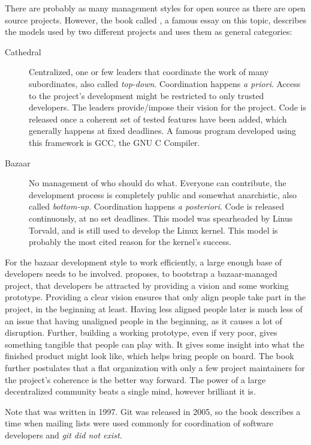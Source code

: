 There are probably as many management styles for open source as there are open source projects.
However, the book called  \cite{raymond_cathedral_2001}, a famous essay on this topic, describes the models used by two different projects and uses them as general categories:

\begin{description}
  \item[Cathedral]
    Centralized, one or few leaders that coordinate the work of many subordinates, also called \textit{top-down}.
    Coordination happens \textit{a priori}.
    Access to the project's development might be restricted to only trusted developers.
    The leaders provide/impose their vision for the project.
    Code is released once a coherent set of tested features have been added, which generally happens at fixed deadlines.
    A famous program developed using this framework is GCC, the GNU C Compiler.
  \item[Bazaar]
    No management of who should do what.
    Everyone can contribute, the development process is completely public and somewhat anarchistic, also called \textit{bottom-up}.
    Coordination happens \textit{a posteriori}.
    Code is released continuously, at no set deadlines.
    This model was spearheaded by Linus Torvald, and is still used to develop the Linux kernel.
    This model is probably the most cited reason for the kernel's success.
\end{description}

For the bazaar development style to work efficiently, a large enough base of developers needs to be involved.
\citeauthor{raymond_cathedral_2001} proposes, to bootstrap a bazaar-managed project, that developers be attracted by providing a vision and some working prototype.
Providing a clear vision ensures that only align people take part in the project, in the beginning at least.
Having less aligned people later is much less of an issue that having unaligned people in the beginning, as it causes a lot of disruption.
Further, building a working prototype, even if very poor, gives something tangible that people can play with.
It gives some insight into what the finished product might look like, which helps bring people on board.
The book further postulates that a flat organization with only a few project maintainers for the project's coherence is the better way forward.
The power of a large decentralized community beats a single mind, however brilliant it is.

Note that  was written in 1997.
Git was released in 2005, so the book describes a time when mailing lists were used commonly for coordination of software developers and \emph{git did not exist}.

